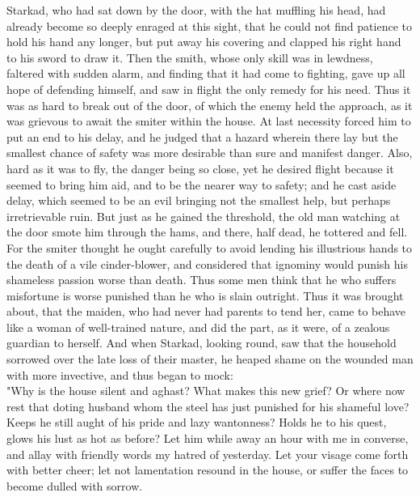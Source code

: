 \documentclass[10pt,a4paper]{report}
\begin{document}
Starkad, who had sat down by the door, with the hat muffling his head, had already become so deeply enraged at this sight, that he could not find patience to hold his hand any longer, but put away his covering and clapped his right hand to his sword to draw it. Then the smith, whose only skill was in lewdness, faltered with sudden alarm, and finding that it had come to fighting, gave up all hope of defending himself, and saw in flight the only remedy for his need. Thus it was as hard to break out of the door, of which the enemy held the approach, as it was grievous to await the smiter within the house. At last necessity forced him to put an end to his delay, and he judged that a hazard wherein there lay but the smallest chance of safety was more desirable than sure and manifest danger. Also, hard as it was to fly, the danger being so close, yet he desired flight because it seemed to bring him aid, and to be the nearer way to safety; and he cast aside delay, which seemed to be an evil bringing not the smallest help, but perhaps irretrievable ruin. But just as he gained the threshold, the old man watching at the door smote him through the hams, and there, half dead, he tottered and fell. For the smiter thought he ought carefully to avoid lending his illustrious hands to the death of a vile cinder-blower, and considered that ignominy would punish his shameless passion worse than death. Thus some men think that he who suffers misfortune is worse punished than he who is slain outright. Thus it was brought about, that the maiden, who had never had parents to tend her, came to behave like a woman of well-trained nature, and did the part, as it were, of a zealous guardian to herself. And when Starkad, looking round, saw that the household sorrowed over the late loss of their master, he heaped shame on the wounded man with more invective, and thus began to mock:\\

"Why is the house silent and aghast? What makes this new grief? Or where now rest that doting husband whom the steel has just punished for his shameful love? Keeps he still aught of his pride and lazy wantonness? Holds he to his quest, glows his lust as hot as before? Let him while away an hour with me in converse, and allay with friendly words my hatred of yesterday. Let your visage come forth with better cheer; let not lamentation resound in the house, or suffer the faces to become dulled with sorrow.\\
\end{document}
